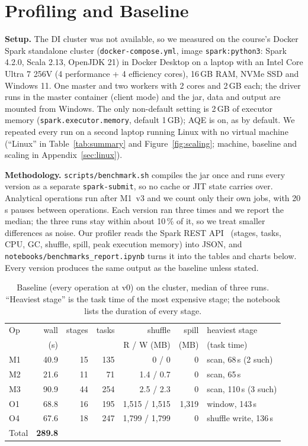 \documentclass[sigconf]{acmart}
\begin{document}
\section{Profiling and Baseline}
\textbf{Setup.} The DI cluster was not available, so we measured on the course's Docker Spark standalone cluster (\texttt{docker-compose.yml}, image
\texttt{spark:python3}: Spark 4.2.0, Scala 2.13, OpenJDK 21) in Docker Desktop on a laptop with an Intel Core Ultra 7 256V
(4 performance + 4 efficiency cores), 16\,GB RAM, NVMe SSD and Windows 11. One master and two workers with 2 cores and 2\,GB each;
the driver runs in the master container (client mode) and the jar, data and output are mounted from Windows. The only non-default
setting is 2\,GB of executor memory (\texttt{spark.executor.memory}, default 1\,GB); AQE is on, as by default. We repeated
every run on a second laptop running Linux with no virtual machine (``Linux'' in Table~\ref{tab:summary} and
Figure~\ref{fig:scaling}; machine, baseline and scaling in Appendix~\ref{sec:linux}).

\textbf{Methodology.} \texttt{scripts/benchmark.sh} compiles the jar once and runs every version as a separate
\texttt{spark-submit}, so no cache or JIT state carries over. Analytical operations run after M1~v3 and we count only their own
jobs, with 20\,s pauses between operations. Each version ran three times and we report the median; the three runs stay within about 10\,\% of it, so
we treat smaller differences as noise. Our profiler reads the Spark REST API~\cite{spark} (stages, tasks, CPU, GC,
shuffle, spill, peak execution memory) into JSON, and \texttt{notebooks/benchmarks\_report.ipynb} turns it into the tables and
charts below. Every version produces the same output as the baseline unless stated.

\begin{table}[t]
\centering\footnotesize\setlength{\tabcolsep}{3pt}
\caption{Baseline (every operation at v0) on the cluster, median of three runs. ``Heaviest stage'' is the task time of the
most expensive stage; the notebook lists the duration of every stage.}
\label{tab:baseline}
\begin{tabular}{lrrrrrl}
\toprule
Op & wall & stages & tasks & shuffle & spill & heaviest stage \\
   & (s)  &        &       & R / W (MB) & (MB)  & (task time) \\
\midrule
M1 & 40.9 & 15 & 135 & 0 / 0 & 0       & scan, 68\,s (2 such) \\
M2 & 21.6 & 11 & 71  & 1.4 / 0.7 & 0       & scan, 65\,s \\
M3 & 90.9 & 44 & 254 & 2.5 / 2.3 & 0       & scan, 110\,s (3 such) \\
O1 & 68.8 & 16 & 195 & 1{,}515 / 1{,}515 & 1{,}319 & window, 143\,s \\
O4 & 67.6 & 18 & 247 & 1{,}799 / 1{,}799 & 0       & shuffle write, 136\,s \\
\midrule
Total & \textbf{289.8} & & & & & \\
\bottomrule
\end{tabular}
\end{table}
\end{document}
